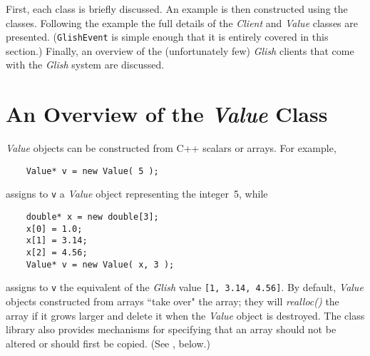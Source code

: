 First, each class is  briefly discussed.  An example 
is then constructed using the classes.  Following the example
the full details of the {\em Client} and {\em Value} classes
are presented.  ({\tt GlishEvent} is simple enough that it 
is entirely covered in this section.)  Finally, an overview of 
the (unfortunately few)
{\em Glish} clients that come with the {\em Glish} system are 
discussed.

\section{An Overview of the {\em Value} Class}
\label{value-class-overview}

{\em Value} objects can be constructed from C++ scalars or arrays.
For example,
\begin{verbatim}
    Value* v = new Value( 5 );
\end{verbatim}
assigns to {\tt v} a {\em Value} object representing the integer~5, while
\begin{verbatim}
    double* x = new double[3];
    x[0] = 1.0;
    x[1] = 3.14;
    x[2] = 4.56;
    Value* v = new Value( x, 3 );
\end{verbatim}
assigns to {\tt v} the equivalent of the {\em Glish} value {\tt [1, 3.14, 4.56]}.
By default, {\em Value} objects constructed from arrays ``take over"
the array; they will {\em realloc()} the array if it grows larger and
delete it when the {\em Value} object is destroyed.  The class library
also provides mechanisms for specifying that an array should
not be altered or should first be copied.  (See , below.)

